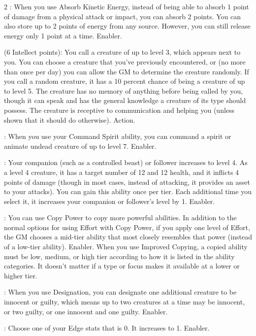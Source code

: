 \begin{multicols}{2}
: When you use Absorb Kinetic Energy, instead of being able to absorb 1 point of damage from a physical attack or impact, you can absorb 2 points. You can also store up to 2 points of energy from any source. However, you can still release energy only 1 point at a time. Enabler. 
 
 (6 Intellect points): You call a creature of up to level 3, which appears next to you. You can choose a creature that you’ve previously encountered, or (no more than once per day) you can allow the GM to determine the creature randomly. If you call a random creature, it has a 10 percent chance of being a creature of up to level 5. The creature has no memory of anything before being called by you, though it can speak and has the general knowledge a creature of its type should possess. The creature is receptive to communication and helping you (unless shown that it should do otherwise). Action. 
 
: When you use your Command Spirit ability, you can command a spirit or animate undead creature of up to level 7.
Enabler.
 
: Your companion (such as a controlled beast) or follower increases to level 4. As a level 4 creature, it has a target number of 12 and 12 health, and it inflicts 4 points of damage (though in most cases, instead of attacking, it provides an asset to your attacks). You can gain this ability once per tier. Each additional time you select it, it increases your companion or follower’s level by 1. Enabler. 

: You can use Copy Power to copy more powerful abilities. In addition to the normal options for using Effort with Copy Power, if you apply one level of Effort, the GM chooses a mid-tier ability that most closely resembles that power (instead of a low-tier ability). Enabler.
When you use Improved Copying, a copied ability must be low, medium, or high tier according to how it is listed in the ability categories. It doesn’t matter if a type or focus makes it available at a lower or higher tier.

: When you use Designation, you can designate one additional creature to be innocent or guilty, which means up to two creatures at a time may be innocent, or two guilty, or one innocent and one guilty. Enabler. 
 
: Choose one of your Edge stats that is 0. It increases to 1. Enabler.
 

\end{multicols}
